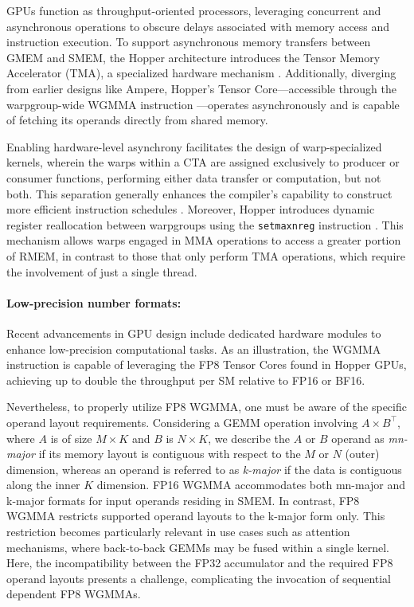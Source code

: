 GPUs function as throughput-oriented processors, leveraging concurrent and asynchronous operations to obscure delays associated with memory access and instruction execution. To support asynchronous memory transfers between GMEM and SMEM, the Hopper architecture introduces the Tensor Memory Accelerator (TMA), a specialized hardware mechanism \cite[\S7.29]{cuda}. Additionally, diverging from earlier designs like Ampere, Hopper's Tensor Core—accessible through the warpgroup-wide WGMMA instruction \cite[\S9.7.14]{ptx}—operates asynchronously and is capable of fetching its operands directly from shared memory.

Enabling hardware-level asynchrony facilitates the design of warp-specialized kernels, wherein the warps within a CTA are assigned exclusively to producer or consumer functions, performing either data transfer or computation, but not both. This separation generally enhances the compiler’s capability to construct more efficient instruction schedules \citep{warp-specialization-2011}. Moreover, Hopper introduces dynamic register reallocation between warpgroups using the \verb|setmaxnreg| instruction \cite[\S9.7.17.1]{ptx}. This mechanism allows warps engaged in MMA operations to access a greater portion of RMEM, in contrast to those that only perform TMA operations, which require the involvement of just a single thread.

\paragraph{Low-precision number formats:}
\label{sec:low-precision-gpu}
Recent advancements in GPU design include dedicated hardware modules to enhance low-precision computational tasks. As an illustration, the WGMMA instruction is capable of leveraging the FP8 Tensor Cores found in Hopper GPUs, achieving up to double the throughput per SM relative to FP16 or BF16.

Nevertheless, to properly utilize FP8 WGMMA, one must be aware of the specific operand layout requirements. Considering a GEMM operation involving $A \times B^{\top}$, where $A$ is of size $M\times K$ and $B$ is $N\times K$, we describe the $A$ or $B$ operand as \emph{mn-major} if its memory layout is contiguous with respect to the $M$ or $N$ (outer) dimension, whereas an operand is referred to as \emph{k-major} if the data is contiguous along the inner $K$ dimension. FP16 WGMMA accommodates both mn-major and k-major formats for input operands residing in SMEM. In contrast, FP8 WGMMA restricts supported operand layouts to the k-major form only. This restriction becomes particularly relevant in use cases such as attention mechanisms, where back-to-back GEMMs may be fused within a single kernel. Here, the incompatibility between the FP32 accumulator and the required FP8 operand layouts presents a challenge, complicating the invocation of sequential dependent FP8 WGMMAs.

